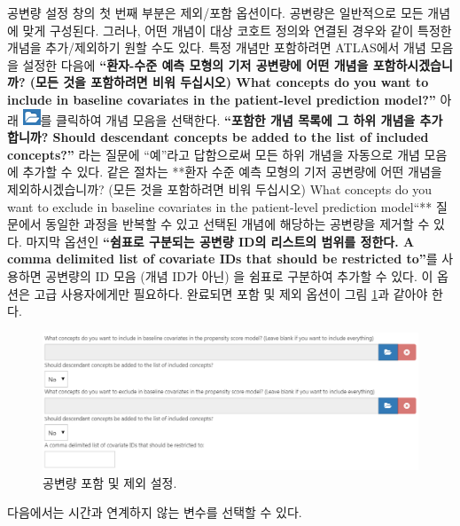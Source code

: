 \documentclass[10.5pt]{book}
\theoremstyle{definition}
\theoremstyle{definition}
\theoremstyle{definition}
\theoremstyle{remark}
\begin{document}
공변량 설정 창의 첫 번째 부분은 제외/포함 옵션이다. 공변량은 일반적으로
모든 개념에 맞게 구성된다. 그러나, 어떤 개념이 대상 코호트 정의와 연결된
경우와 같이 특정한 개념을 추가/제외하기 원할 수도 있다. 특정 개념만
포함하려면 ATLAS에서 개념 모음을 설정한 다음에 \textbf{``환자-수준 예측
모형의 기저 공변량에 어떤 개념을 포함하시겠습니까? (모든 것을 포함하려면
비워 두십시오) What concepts do you want to include in baseline
covariates in the patient-level prediction model?''} 아래
\includegraphics{images/PopulationLevelEstimation/open.png}를 클릭하여
개념 모음을 선택한다. \textbf{``포함한 개념 목록에 그 하위 개념을
추가합니까? Should descendant concepts be added to the list of included
concepts?''} 라는 질문에 ``예''라고 답함으로써 모든 하위 개념을 자동으로
개념 모음에 추가할 수 있다. 같은 절차는 **환자 수준 예측 모형의 기저
공변량에 어떤 개념을 제외하시겠습니까? (모든 것을 포함하려면 비워
두십시오) What concepts do you want to exclude in baseline covariates in
the patient-level prediction model``** 질문에서 동일한 과정을 반복할 수
있고 선택된 개념에 해당하는 공변량을 제거할 수 있다. 마지막 옵션인
\textbf{``쉼표로 구분되는 공변량 ID의 리스트의 범위를 정한다. A comma
delimited list of covariate IDs that should be restricted to''}를
사용하면 공변량의 ID 모음 (개념 ID가 아닌) 을 쉼표로 구분하여 추가할 수
있다. 이 옵션은 고급 사용자에게만 필요하다. 완료되면 포함 및 제외 옵션이
그림 \ref{fig:covariateSettings1}과 같아야 한다.

\begin{figure}

{\centering \includegraphics[width=1\linewidth]{images/PatientLevelPrediction/covariateSettings1} 

}

\caption{공변량 포함 및 제외 설정.}\label{fig:covariateSettings1}
\end{figure}

다음에서는 시간과 연계하지 않는 변수를 선택할 수 있다.
\end{document}
